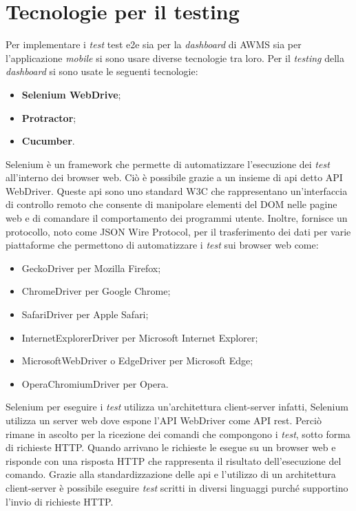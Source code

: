 \section{Tecnologie per il testing}
Per implementare i \emph{test} \gls{test e2e} sia per la \emph{dashboard} di \gls{AWMS} sia per l'applicazione \emph{mobile} si sono usare diverse tecnologie tra loro. Per il \emph{testing} della \emph{dashboard} si sono usate le seguenti tecnologie:
\begin{itemize}
	\item \textbf{Selenium WebDrive};
	\item \textbf{Protractor};
	\item \textbf{Cucumber}.
\end{itemize}
Selenium è un \gls{framework}\ap{[g]} che permette di automatizzare l'esecuzione dei \emph{test} all'interno dei \gls{browser web}\ap{[g]}. Ciò è possibile grazie a un insieme di \gls{api}\ap{[g]} detto API WebDriver. Queste \gls{api}\ap{[g]} sono uno standard W3C che rappresentano un'interfaccia di controllo remoto che consente di manipolare elementi del DOM nelle pagine web e di comandare il comportamento dei programmi utente. Inoltre, fornisce un protocollo, noto come JSON Wire Protocol, per il trasferimento dei dati per varie piattaforme che permettono di automatizzare i \emph{test} sui \gls{browser web}\ap{[g]} come:
\begin{itemize}
	\item GeckoDriver per Mozilla Firefox;
	\item ChromeDriver per Google Chrome;
	\item SafariDriver per Apple Safari;
	\item InternetExplorerDriver per Microsoft Internet Explorer;
	\item MicrosoftWebDriver o EdgeDriver per Microsoft Edge;
	\item OperaChromiumDriver per Opera.
\end{itemize}
Selenium per eseguire i \emph{test} utilizza un’architettura client-server infatti, Selenium utilizza un server web dove espone l'API WebDriver come API \gls{rest}\glsfirstoccur. Perciò rimane in ascolto per la ricezione dei comandi che compongono i \emph{test}, sotto forma di richieste HTTP. Quando arrivano le richieste le esegue su un \gls{browser web}\ap{[g]} e risponde con una risposta HTTP che rappresenta il risultato dell'esecuzione del comando. Grazie alla standardizzazione delle \gls{api}\ap{[g]} e l'utilizzo di un architettura client-server è possibile eseguire \emph{test} scritti in diversi linguaggi purché supportino l'invio di richieste HTTP.\\

